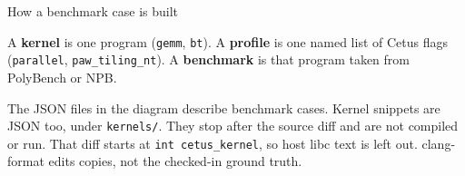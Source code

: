\documentclass[aspectratio=169,11pt]{beamer}
\begin{document}
\begin{frame}{How a benchmark case is built}
  \vspace{0.2em}
  \begin{minipage}{\linewidth}
  \raggedright\footnotesize
  A \textbf{kernel} is one program (\texttt{gemm}, \texttt{bt}).
  A \textbf{profile} is one named list of Cetus flags
  (\texttt{parallel}, \texttt{paw\_tiling\_nt}).
  A \textbf{benchmark} is that program taken from PolyBench or NPB.

  \vspace{0.35em}
  The JSON files in the diagram describe benchmark cases.
  Kernel snippets are JSON too, under \texttt{kernels/}.
  They stop after the source diff and are not compiled or run.
  That diff starts at \texttt{int cetus\_kernel}, so host libc text is left out.
  clang-format edits copies, not the checked-in ground truth.
  \end{minipage}
\end{frame}
\end{document}
